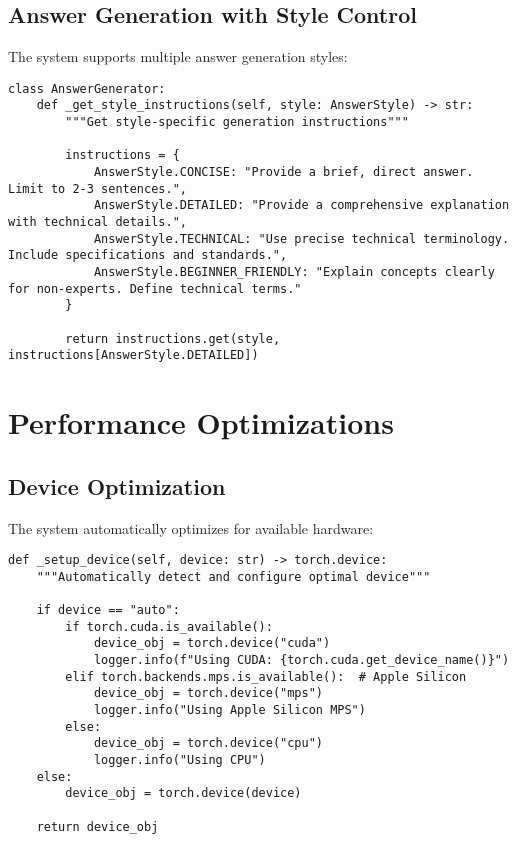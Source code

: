 \documentclass[10pt,a4paper,twocolumn]{article}
\begin{document}
\subsection{Answer Generation with Style Control}

The system supports multiple answer generation styles:

\begin{lstlisting}[caption={Style-Controlled Answer Generation}]
class AnswerGenerator:
    def _get_style_instructions(self, style: AnswerStyle) -> str:
        """Get style-specific generation instructions"""
        
        instructions = {
            AnswerStyle.CONCISE: "Provide a brief, direct answer. Limit to 2-3 sentences.",
            AnswerStyle.DETAILED: "Provide a comprehensive explanation with technical details.",
            AnswerStyle.TECHNICAL: "Use precise technical terminology. Include specifications and standards.",
            AnswerStyle.BEGINNER_FRIENDLY: "Explain concepts clearly for non-experts. Define technical terms."
        }
        
        return instructions.get(style, instructions[AnswerStyle.DETAILED])
\end{lstlisting}

\section{Performance Optimizations}

\subsection{Device Optimization}

The system automatically optimizes for available hardware:

\begin{lstlisting}[caption={Hardware Optimization}]
def _setup_device(self, device: str) -> torch.device:
    """Automatically detect and configure optimal device"""
    
    if device == "auto":
        if torch.cuda.is_available():
            device_obj = torch.device("cuda")
            logger.info(f"Using CUDA: {torch.cuda.get_device_name()}")
        elif torch.backends.mps.is_available():  # Apple Silicon
            device_obj = torch.device("mps")
            logger.info("Using Apple Silicon MPS")
        else:
            device_obj = torch.device("cpu")
            logger.info("Using CPU")
    else:
        device_obj = torch.device(device)
    
    return device_obj
\end{lstlisting}
\end{document}
